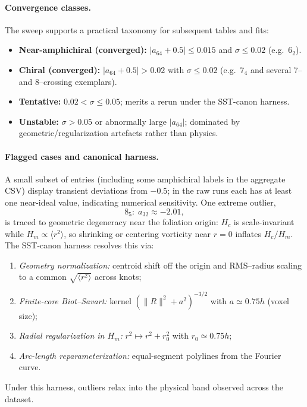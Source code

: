 \paragraph{Convergence classes.}
The sweep supports a practical taxonomy for subsequent tables and fits:
\begin{itemize}
    \item \textbf{Near-amphichiral (converged):} $|a_{64}+0.5|\le 0.015$ and $\sigma\le 0.02$ (e.g.\ $6_2$).
    \item \textbf{Chiral (converged):} $|a_{64}+0.5|> 0.02$ with $\sigma\le 0.02$ (e.g.\ $7_4$ and several $7$– and $8$–crossing exemplars).
    \item \textbf{Tentative:} $0.02<\sigma\le 0.05$; merits a rerun under the SST-canon harness.
    \item \textbf{Unstable:} $\sigma>0.05$ or abnormally large $|a_{64}|$; dominated by geometric/regularization artefacts rather than physics.
\end{itemize}

\paragraph{Flagged cases and canonical harness.}
A small subset of entries (including some amphichiral labels in the aggregate CSV) display transient deviations from $-0.5$; in the raw runs each has at least one near-ideal value, indicating numerical sensitivity. One extreme outlier,
\[
    8_5:\; a_{32}\approx -2.01,
\]
is traced to geometric degeneracy near the foliation origin: $H_c$ is scale-invariant while $H_m\propto\langle r^2\rangle$, so shrinking or centering vorticity near $r\!=\!0$ inflates $H_c/H_m$. The SST-canon harness resolves this via:
\begin{enumerate}
    \item \emph{Geometry normalization:} centroid shift off the origin and RMS–radius scaling to a common $\sqrt{\langle r^2\rangle}$ across knots;
    \item \emph{Finite-core Biot--Savart:} kernel $(\|R\|^2+a^2)^{-3/2}$ with $a\simeq0.75h$ (voxel size);
    \item \emph{Radial regularization in $H_m$:} $r^2\mapsto r^2+r_0^2$ with $r_0\simeq0.75h$;
    \item \emph{Arc-length reparameterization:} equal-segment polylines from the Fourier curve.
\end{enumerate}
Under this harness, outliers relax into the physical band observed across the dataset.

